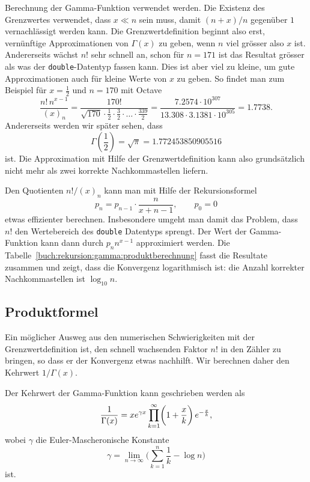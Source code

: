 Berechnung der Gamma-Funktion verwendet werden.
Die Existenz des Grenzwertes verwendet, dass $x\ll n$ sein muss,
damit $(n+x)/n$ gegenüber $1$ vernachlässigt werden kann.
Die Grenzwertdefinition beginnt also erst, vernünftige Approximationen
von $\Gamma(x)$ zu geben, wenn $n$ viel grösser also $x$ ist.
Andererseits wächst $n!$ sehr schnell an, schon für $n=171$ ist
das Resultat grösser als was der \texttt{double}-Datentyp fassen kann.
Dies ist aber viel zu kleine, um gute Approximationen auch für kleine
Werte von $x$ zu geben.
So findet man zum Beispiel für $x=\frac12$ und $n=170$ mit Octave
\[
\frac{n!\,n^{x-1}}{(x)_n}
=
\frac{170!}{\sqrt{170}\cdot \frac12\cdot\frac32\cdot\ldots\cdot\frac{339}{2}}
=
\frac{7.2574\cdot10^{307}}{13.308\cdot 3.1381\cdot10^{305}}
=
1.7738.
\]
Andererseits werden wir später sehen, dass 
\[
\Gamma({\textstyle\frac12})
=
\sqrt{\pi}
=
1.772453850905516
\]
ist.
Die Approximation mit Hilfe der Grenzwertdefinition kann also
grundsätzlich nicht mehr als zwei korrekte Nachkommastellen liefern.

Den Quotienten $n!/(x)_n$ kann man mit Hilfe der Rekursionsformel
\begin{equation}
p_n = p_{n-1}\cdot \frac{n}{x+n-1},\qquad
p_0 = 0
\label{buch:rekursion:gamma:pnfolge}
\end{equation}
etwas effizienter berechnen. 
Insbesondere umgeht man damit das Problem, dass $n!$ den Wertebereich 
des \texttt{double} Datentyps sprengt.
Der Wert der Gamma-Funktion kann dann durch $p_nn^{x-1}$ approximiert
werden.
Die Tabelle~\ref{buch:rekursion:gamma:produktberechnung} fasst die
Resultate zusammen und zeigt, dass die Konvergenz logarithmisch ist:
die Anzahl korrekter Nachkommastellen ist $\log_{10}n$.

%
%
\subsection{Produktformel}
Ein möglicher Ausweg aus den numerischen Schwierigkeiten mit der
Grenzwertdefinition ist, den schnell wachsenden Faktor $n!$
in den Zähler zu bringen, so dass er der Konvergenz etwas nachhilft.
Wir berechnen daher den Kehrwert $1/\Gamma(x)$.

\begin{satz}
\label{buch:rekursion:gamma:satz:produktformel}
Der Kehrwert der Gamma-Funktion kann geschrieben werden als
\begin{equation}
\frac{1}{\Gamma(x)}
=
xe^{\gamma x}
\prod_{k=1}^\infty
\biggl(1+\frac{x}k\biggr)\,e^{-\frac{x}{k}},
\label{buch:rekursion:gamma:eqn:produktformel}
\index{Gamma-Funktion!Produktformel}%
\end{equation}
wobei $\gamma$ die Euler-Mascheronische Konstante
%
\[
\gamma
=
\lim_{n\to\infty}
\biggl(\sum_{k=1}^n\frac{1}{k}-\log n\biggr)
\]
ist.
%
%
\end{satz}

